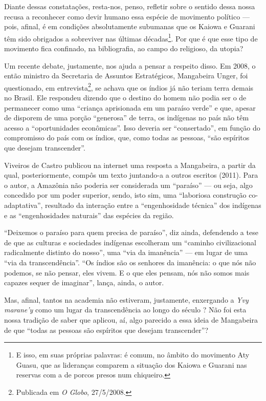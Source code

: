 Diante dessas constatações, resta-nos, penso, refletir sobre o sentido
dessa nossa recusa a reconhecer como devir humano essa espécie de
movimento político --- pois, afinal, é em condições absolutamente
subumanas que os Kaiowa e Guarani têm sido obrigados a sobreviver nas
últimas décadas\footnote{E isso, em suas próprias palavras: é comum, no
âmbito do movimento Aty Guasu, que as lideranças comparem a situação
dos Kaiowa e Guarani nas reservas com a de porcos presos num
chiqueiro.}. Por que é que esse tipo de movimento fica confinado, na
bibliografia, ao campo do religioso, da utopia?

Um recente debate, justamente, nos ajuda a pensar a respeito disso. Em
2008, o então ministro da Secretaria de Assuntos Estratégicos,
Mangabeira Unger, foi questionado, em entrevista\footnote{Publicada em
\emph{O Globo}, 27/5/2008.}, se achava que os índios já não teriam terra
demais no Brasil. Ele respondeu dizendo que o destino do homem não
podia ser o de permanecer como uma ``criança aprisionada em um paraíso
verde'' e que, apesar de disporem de uma porção ``generosa'' de terra, os
indígenas no país não têm acesso a ``oportunidades econômicas''. Isso
deveria ser ``consertado'', em função do compromisso do país com os
índios, que, como todas as pessoas, ``são espíritos que desejam
transcender''.

Viveiros de Castro publicou na internet uma resposta a Mangabeira, a
partir da qual, posteriormente, compôs um texto juntando-a a outros
escritos (2011). Para o autor, a Amazônia não poderia ser considerada
um ``paraíso'' --- ou seja, algo concedido por um poder superior, sendo,
isto sim, uma ``laboriosa construção co-adaptativa'', resultado da
interação entre a ``engenhosidade técnica'' dos indígenas e as
``engenhosidades naturais''  das espécies da região. 

``Deixemos o paraíso para quem precisa de paraíso'', diz ainda, defendendo
a tese de que as culturas e sociedades indígenas escolheram um ``caminho
civilizacional radicalmente distinto do nosso'', uma ``via da imanência''
--- em lugar de uma ``via da transcendência''. ``Os índios são os senhores
da imanência: o que nós não podemos, se não pensar, eles vivem. E o que
eles pensam, nós não somos mais capazes sequer de imaginar'', lança,
ainda, o autor.

Mas, afinal, tantos na academia não estiveram, justamente, enxergando a
\emph{Yvy marane’y} como um lugar da transcendência ao longo do século ? Não
foi esta nossa tradição de saber que aplicou, aí, algo parecido a essa
ideia de Mangabeira de que ``todas as pessoas são espíritos que desejam
transcender''?

